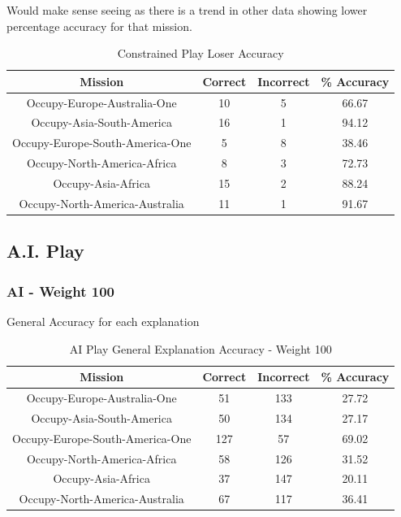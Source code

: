 \documentclass[parskip]{cs4rep}
\begin{document}
Would make sense seeing as there is a trend in other data showing lower percentage accuracy for that mission.
		
\begin{table}[ht]
\centering	
\begin{tabular}{|c|c|c|c|}
\hline 
\textbf{Mission} & \textbf{Correct} & \textbf{Incorrect} & \textbf{\% Accuracy} \\ 
\hline 
Occupy-Europe-Australia-One & 10 & 5 & 66.67 \\  
\hline 
Occupy-Asia-South-America & 16 & 1 & 94.12 \\ 
\hline
Occupy-Europe-South-America-One & 5 & 8 & 38.46 \\
\hline
Occupy-North-America-Africa & 8 & 3 & 72.73 \\
\hline
Occupy-Asia-Africa & 15 & 2 & 88.24 \\
\hline
Occupy-North-America-Australia & 11 & 1 & 91.67 \\
\hline
\end{tabular}
\caption{Constrained Play Loser Accuracy}
\label{table:constrained-lose-accuracy}
\end{table}			

\newpage

\subsection{A.I. Play}

\subsubsection{AI - Weight 100}

General Accuracy for each explanation

\begin{table}[ht]
\centering
\begin{tabular}{|c|c|c|c|}
\hline 
\textbf{Mission} & \textbf{Correct} & \textbf{Incorrect} & \textbf{\% Accuracy} \\ 
\hline 
Occupy-Europe-Australia-One & 51 & 133 & 27.72 \\  
\hline 
Occupy-Asia-South-America & 50 & 134 & 27.17 \\ 
\hline
Occupy-Europe-South-America-One & 127 & 57 & 69.02 \\
\hline
Occupy-North-America-Africa & 58 & 126 & 31.52 \\
\hline
Occupy-Asia-Africa & 37 & 147 & 20.11 \\
\hline
Occupy-North-America-Australia & 67 & 117 & 36.41 \\
\hline
\end{tabular}
\caption{AI Play General Explanation Accuracy - Weight 100}
\label{table:ai-100-general-accuracy}
\end{table}
\end{document}
